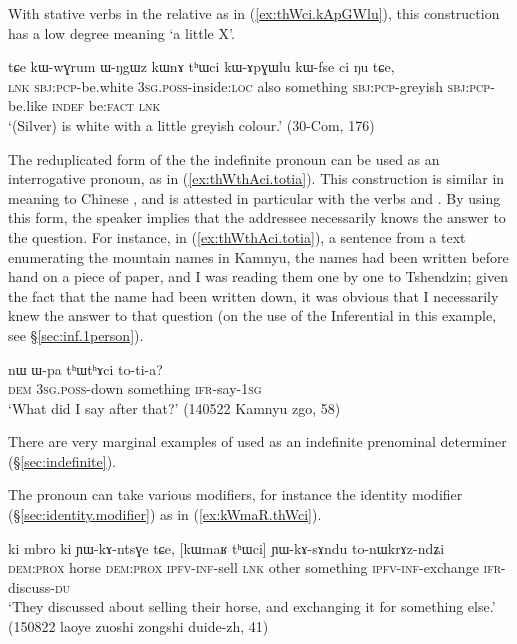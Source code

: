 With stative verbs in the relative as in (\ref{ex:thWci.kApGWlu}), this construction has a low degree meaning `a little X'.

\begin{exe}
\ex \label{ex:thWci.kApGWlu}
\gll   tɕe kɯ-wɣrum ɯ-ŋgɯz kɯnɤ tʰɯci kɯ-ɤpɣɯlu kɯ-fse ci ŋu tɕe, \\
\textsc{lnk} \textsc{sbj}:\textsc{pcp}-be.white \textsc{3sg}.\textsc{poss}-inside:\textsc{loc} also something \textsc{sbj}:\textsc{pcp}-greyish \textsc{sbj}:\textsc{pcp}-be.like \textsc{indef} be:\textsc{fact} \textsc{lnk} \\
\glt `(Silver) is white with a little greyish colour.' (30-Com, 176)
\end{exe}
  
 The reduplicated form of the the indefinite pronoun  can be used as an interrogative pronoun, as in (\ref{ex:thWthAci.totia}). This construction is similar in meaning to Chinese , and is attested in particular with the verbs  and . By using this form, the speaker implies that the addressee necessarily knows the answer to the question. For instance,  in (\ref{ex:thWthAci.totia}), a sentence from a text enumerating the mountain names in Kamnyu, the names had been written before hand on a piece of paper, and I was reading them one by one to Tshendzin; given the fact that the name had been written down, it was obvious that I necessarily knew the answer to that question (on the use of the Inferential in this example, see §\ref{sec:inf.1person}).
  
 \begin{exe}
\ex \label{ex:thWthAci.totia}
 \gll  nɯ ɯ-pa tʰɯtʰɤci to-ti-a? \\
 \textsc{dem} \textsc{3sg}.\textsc{poss}-down something \textsc{ifr}-say-\textsc{1sg} \\
 \glt `What did I say after that?' (140522 Kamnyu zgo, 58)
\end{exe}

 There are very marginal examples of  used as an indefinite prenominal determiner (§\ref{sec:indefinite}).

The pronoun  can take various modifiers, for instance the identity modifier  (§\ref{sec:identity.modifier})  as in (\ref{ex:kWmaR.thWci}). 
 
\begin{exe}
\ex \label{ex:kWmaR.thWci}
\gll    ki mbro ki ɲɯ-kɤ-ntsɣe tɕe, [kɯmaʁ tʰɯci] ɲɯ-kɤ-sɤndu to-nɯkrɤz-ndʑi \\
\textsc{dem}:\textsc{prox} horse \textsc{dem}:\textsc{prox} \textsc{ipfv}-\textsc{inf}-sell \textsc{lnk} other  something   \textsc{ipfv}-\textsc{inf}-exchange \textsc{ifr}-discuss-\textsc{du} \\
 \glt `They discussed about selling their horse, and exchanging it for something else.' (150822 laoye zuoshi zongshi duide-zh, 41)
\end{exe}

